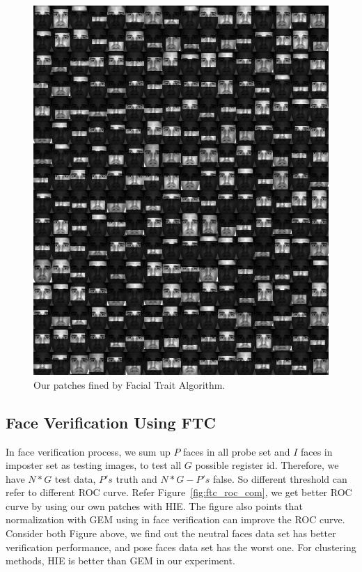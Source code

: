 \documentclass[10pt,twocolumn,letterpaper]{article}
\begin{document}
\begin{figure}[t]
    \begin{center}
        \includegraphics[width=0.8\linewidth]{fig/ftc/ftc_256.png}
    \end{center}
    \caption{Our patches fined by Facial Trait Algorithm.}
    \label{fig:ftc_256}
\end{figure}



\subsection{Face Verification Using FTC}
In face verification process, we sum up $P$ faces in all probe set and
$I$ faces in imposter set as testing images, to test all $G$ 
possible register id. Therefore, we have $N*G$ test data, $P's$ truth and
$N*G-P's$ false. So different threshold can refer to different ROC curve.
Refer Figure~\ref{fig:ftc_roc_com}, we get better ROC curve by 
using our own patches with HIE. The figure also points
that normalization with GEM using in face verification can improve the ROC curve.
Consider both Figure above, we find out the neutral faces data set has better
verification performance, and pose faces data set has the worst one. 
For clustering methods, HIE is better than GEM in our experiment.
\end{document}

